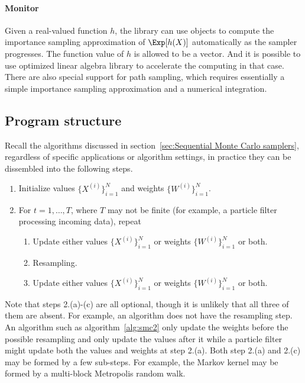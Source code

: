 \paragraph{Monitor}

Given a real-valued function $h$, the library can use 
objects to compute the importance sampling approximation of $\Exp[h(X)]$
automatically as the sampler progresses. The function value of $h$ is allowed
to be a vector. And it is possible to use optimized linear algebra library to
accelerate the computing in that case. There are also special support for path
sampling, which requires essentially a simple importance sampling
approximation and a numerical integration.

\subsection{Program structure}
\label{sub:Program structure}

Recall the \smc algorithms discussed in section~\ref{sec:Sequential Monte
  Carlo samplers}, regardless of specific applications or algorithm settings,
in practice they can be dissembled into the following steps.
\begin{enumerate}
  \item Initialize values $\{X^{(i)}\}_{i=1}^N$ and weights
    $\{W^{(i)}\}_{i=1}^N$.
  \item For $t = 1,\dots,T$, where $T$ may not be finite (for example, a
    particle filter processing incoming data), repeat
    \begin{enumerate}
      \item Update either values $\{X^{(i)}\}_{i=1}^N$ or weights
        $\{W^{(i)}\}_{i=1}^N$ or both.
      \item Resampling.
      \item Update either values $\{X^{(i)}\}_{i=1}^N$ or weights
        $\{W^{(i)}\}_{i=1}^N$ or both.
    \end{enumerate}
\end{enumerate}
Note that steps 2.(a)-(c) are all optional, though it is unlikely that all
three of them are absent. For example, an \ais algorithm does not have the
resampling step. An \smc algorithm such as algorithm~\ref{alg:smc2} only
update the weights before the possible resampling and only update the values
after it while a particle filter might update both the values and weights at
step 2.(a). Both step 2.(a) and 2.(c) may be formed by a few sub-steps. For
example, the Markov kernel may be formed by a multi-block Metropolis random
walk.

